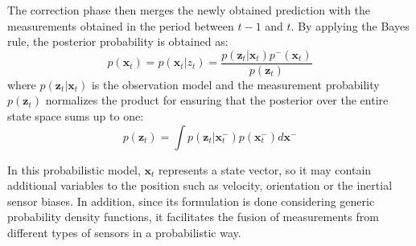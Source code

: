 The correction phase then merges the newly obtained prediction with the measurements obtained in the period between $t-1$ and $t$. 
By applying the Bayes rule, the posterior probability is obtained as:
\begin{equation}
\label{eqn_bayes_corr}
	p(\boldsymbol{x}_t)=p(\boldsymbol{x}_t|z_t)=\frac{p(\boldsymbol{z}_t|\boldsymbol{x}_{t})p^{-}(\boldsymbol{x}_t)}{p(\boldsymbol{z}_t)}
\end{equation}
where $p(\boldsymbol{z}_t|\boldsymbol{x}_{t})$ is the observation model and the measurement probability $p(\boldsymbol{z}_t)$ normalizes the product for ensuring that the posterior over the entire state space sums up to one:
\begin{equation}
\label{eqn_bayes_norm}
	p(\boldsymbol{z}_t)=\int p(\boldsymbol{z}_t|\boldsymbol{x}^{-}_{t})p(\boldsymbol{x}^{-}_{t})d\boldsymbol{x^{-}}
\end{equation}

In this probabilistic model, $\boldsymbol{x}_{t}$ represents a state vector, so it may contain additional variables to the position such as velocity, orientation or the inertial sensor biases.
In addition, since its formulation is done considering generic probability density functions, it facilitates the fusion of measurements from different types of sensors in a probabilistic way.

